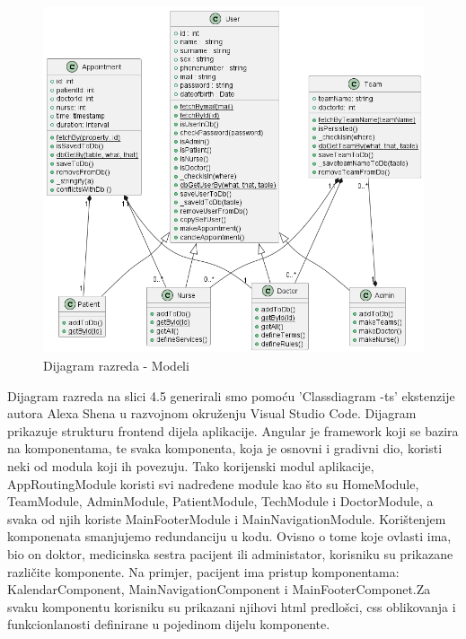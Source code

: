 			\begin{figure}[H]
			            \includegraphics[width=\textwidth]{slike/backend_class_diagram.png} %
			            \caption{Dijagram razreda - Modeli}
			            \label{fig:class1} %
		      \end{figure}
		      
		      \eject
		      
		      
		        Dijagram razreda na slici 4.5 generirali smo pomoću 'Classdiagram -ts' ekstenzije autora Alexa Shena u razvojnom okruženju Visual Studio Code. Dijagram prikazuje strukturu frontend dijela aplikacije. Angular je framework koji se bazira na komponentama, te svaka komponenta, koja je osnovni i gradivni dio, koristi neki od modula koji ih povezuju. Tako korijenski modul aplikacije, AppRoutingModule koristi svi nadređene module kao što su HomeModule, TeamModule, AdminModule, PatientModule, TechModule i DoctorModule, a svaka od njih koriste MainFooterModule i MainNavigationModule. Korištenjem komponenata smanjujemo redundanciju u kodu. Ovisno o tome koje ovlasti ima, bio on doktor, medicinska sestra pacijent ili administator, korisniku su prikazane različite komponente. Na primjer, pacijent ima pristup komponentama: KalendarComponent, MainNavigationComponent i MainFooterComponet.Za svaku komponentu korisniku su prikazani njihovi html predlošci, css oblikovanja i funkcionlanosti definirane u pojedinom dijelu komponente.
                 
